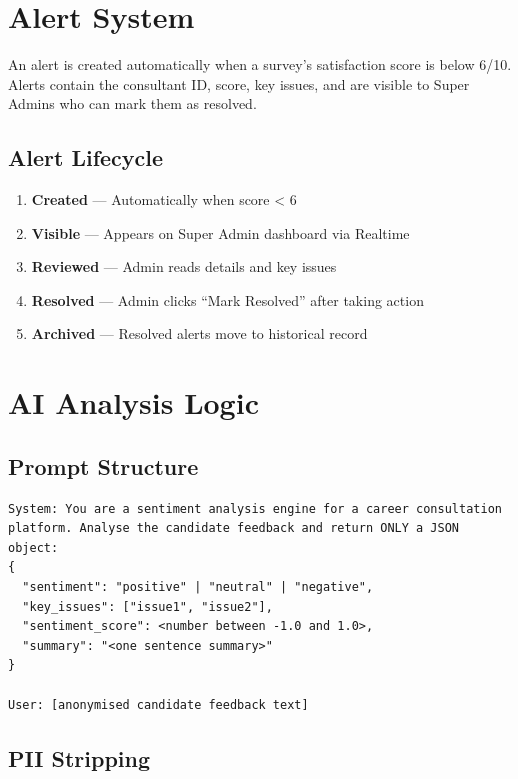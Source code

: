 \documentclass[11pt, a4paper]{article}
\begin{document}
\section{Alert System}

An alert is created automatically when a survey's satisfaction score is below 6/10. Alerts contain the consultant ID, score, key issues, and are visible to Super Admins who can mark them as resolved.

\subsection{Alert Lifecycle}

\begin{enumerate}[leftmargin=2em]
\item \textbf{Created} — Automatically when score < 6
\item \textbf{Visible} — Appears on Super Admin dashboard via Realtime
\item \textbf{Reviewed} — Admin reads details and key issues
\item \textbf{Resolved} — Admin clicks ``Mark Resolved'' after taking action
\item \textbf{Archived} — Resolved alerts move to historical record
\end{enumerate}

\section{AI Analysis Logic}

\subsection{Prompt Structure}

\begin{lstlisting}
System: You are a sentiment analysis engine for a career consultation 
platform. Analyse the candidate feedback and return ONLY a JSON object:
{
  "sentiment": "positive" | "neutral" | "negative",
  "key_issues": ["issue1", "issue2"],
  "sentiment_score": <number between -1.0 and 1.0>,
  "summary": "<one sentence summary>"
}

User: [anonymised candidate feedback text]
\end{lstlisting}

\subsection{PII Stripping}
\end{document}
